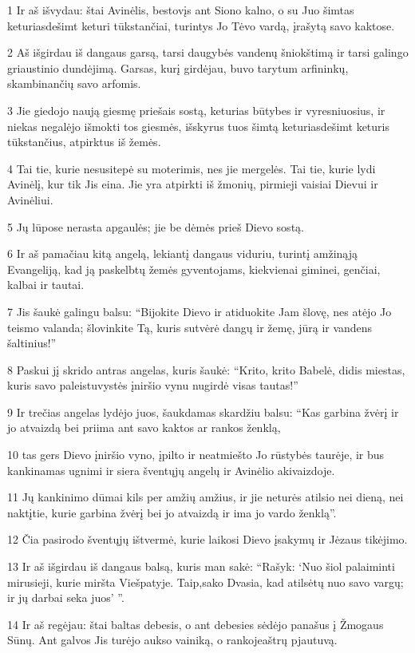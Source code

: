 \par 1 Ir aš išvydau: štai Avinėlis, bestovįs ant Siono kalno, o su Juo šimtas keturiasdešimt keturi tūkstančiai, turintys Jo Tėvo vardą, įrašytą savo kaktose. 
\par 2 Aš išgirdau iš dangaus garsą, tarsi daugybės vandenų šniokštimą ir tarsi galingo griaustinio dundėjimą. Garsas, kurį girdėjau, buvo tarytum arfininkų, skambinančių savo arfomis. 
\par 3 Jie giedojo naują giesmę priešais sostą, keturias būtybes ir vyresniuosius, ir niekas negalėjo išmokti tos giesmės, išskyrus tuos šimtą keturiasdešimt keturis tūkstančius, atpirktus iš žemės. 
\par 4 Tai tie, kurie nesusitepė su moterimis, nes jie mergelės. Tai tie, kurie lydi Avinėlį, kur tik Jis eina. Jie yra atpirkti iš žmonių, pirmieji vaisiai Dievui ir Avinėliui. 
\par 5 Jų lūpose nerasta apgaulės; jie be dėmės prieš Dievo sostą. 
\par 6 Ir aš pamačiau kitą angelą, lekiantį dangaus viduriu, turintį amžinąją Evangeliją, kad ją paskelbtų žemės gyventojams, kiekvienai giminei, genčiai, kalbai ir tautai. 
\par 7 Jis šaukė galingu balsu: “Bijokite Dievo ir atiduokite Jam šlovę, nes atėjo Jo teismo valanda; šlovinkite Tą, kuris sutvėrė dangų ir žemę, jūrą ir vandens šaltinius!” 
\par 8 Paskui jį skrido antras angelas, kuris šaukė: “Krito, krito Babelė, didis miestas, kuris savo paleistuvystės įniršio vynu nugirdė visas tautas!” 
\par 9 Ir trečias angelas lydėjo juos, šaukdamas skardžiu balsu: “Kas garbina žvėrį ir jo atvaizdą bei priima ant savo kaktos ar rankos ženklą, 
\par 10 tas gers Dievo įniršio vyno, įpilto ir neatmiešto Jo rūstybės taurėje, ir bus kankinamas ugnimi ir siera šventųjų angelų ir Avinėlio akivaizdoje. 
\par 11 Jų kankinimo dūmai kils per amžių amžius, ir jie neturės atilsio nei dieną, nei naktį­tie, kurie garbina žvėrį bei jo atvaizdą ir ima jo vardo ženklą”. 
\par 12 Čia pasirodo šventųjų ištvermė, kurie laikosi Dievo įsakymų ir Jėzaus tikėjimo. 
\par 13 Ir aš išgirdau iš dangaus balsą, kuris man sakė: “Rašyk: ‘Nuo šiol palaiminti mirusieji, kurie miršta Viešpatyje. Taip,­sako Dvasia,­ kad atilsėtų nuo savo vargų; ir jų darbai seka juos’ ”. 
\par 14 Ir aš regėjau: štai baltas debesis, o ant debesies sėdėjo panašus į Žmogaus Sūnų. Ant galvos Jis turėjo aukso vainiką, o rankoje­aštrų pjautuvą. 
